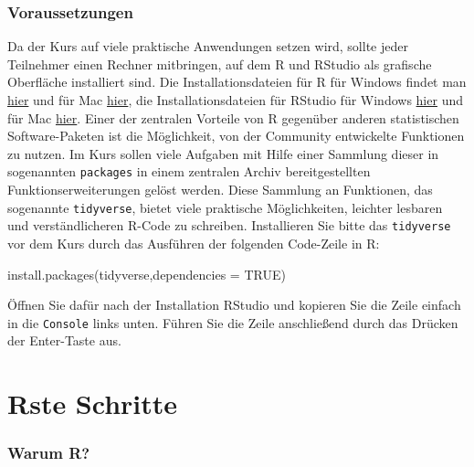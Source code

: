 \documentclass[
]{book}
\newenvironment{Shaded}{\begin{snugshade}}{\end{snugshade}}
\newcommand{\AttributeTok}[1]{\textcolor[rgb]{0.77,0.63,0.00}{#1}}
\newcommand{\ConstantTok}[1]{\textcolor[rgb]{0.00,0.00,0.00}{#1}}
\newcommand{\FunctionTok}[1]{\textcolor[rgb]{0.00,0.00,0.00}{#1}}
\newcommand{\NormalTok}[1]{#1}
\newcommand{\StringTok}[1]{\textcolor[rgb]{0.31,0.60,0.02}{#1}}
\begin{document}
\hypertarget{voraussetzungen}{%
\subsection{Voraussetzungen}\label{voraussetzungen}}

Da der Kurs auf viele praktische Anwendungen setzen wird, sollte jeder Teilnehmer einen Rechner mitbringen, auf dem R und RStudio als grafische Oberfläche installiert sind.
Die Installationsdateien für R für Windows findet man \href{https://cran.r-project.org/bin/windows/base/R-3.6.2-win.exe}{hier} und für Mac \href{https://cran.r-project.org/bin/macosx/R-3.6.2.pkg}{hier}, die Installationsdateien für RStudio für Windows \href{https://download1.rstudio.org/desktop/windows/RStudio-1.2.5033.exe}{hier} und für Mac \href{https://download1.rstudio.org/desktop/macos/RStudio-1.2.5033.dmg}{hier}.
Einer der zentralen Vorteile von R gegenüber anderen statistischen Software-Paketen ist die Möglichkeit, von der Community entwickelte Funktionen zu nutzen. Im Kurs sollen viele Aufgaben mit Hilfe einer Sammlung dieser in sogenannten \texttt{packages} in einem zentralen Archiv bereitgestellten Funktionserweiterungen gelöst werden. Diese Sammlung an Funktionen, das sogenannte \texttt{tidyverse}, bietet viele praktische Möglichkeiten, leichter lesbaren und verständlicheren R-Code zu schreiben.
Installieren Sie bitte das \texttt{tidyverse} vor dem Kurs durch das Ausführen der folgenden Code-Zeile in R:

\begin{Shaded}
\begin{Highlighting}[]
\FunctionTok{install.packages}\NormalTok{(}\StringTok{\textquotesingle{}tidyverse\textquotesingle{}}\NormalTok{,}\AttributeTok{dependencies =} \ConstantTok{TRUE}\NormalTok{)}
\end{Highlighting}
\end{Shaded}

Öffnen Sie dafür nach der Installation RStudio und kopieren Sie die Zeile einfach in die \texttt{Console} links unten.
Führen Sie die Zeile anschließend durch das Drücken der Enter-Taste aus.

\hypertarget{rste-schritte}{%
\chapter{Rste Schritte}\label{rste-schritte}}

\hypertarget{warum-r}{%
\subsection{Warum R?}\label{warum-r}}
\end{document}
